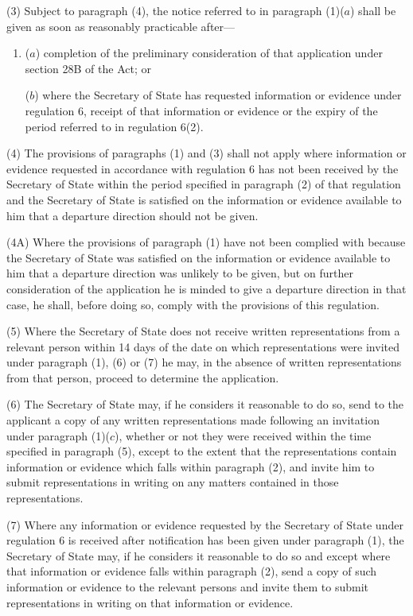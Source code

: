 \documentclass[12pt,a4paper]{article}
\begin{document}
(3) Subject to paragraph (4), the notice referred to in paragraph (1)($a$) shall
be given as soon as reasonably practicable after—
\begin{enumerate}\item[]
($a$) completion of the preliminary consideration of that application under section
28B of the Act; or

($b$) where the Secretary of State has requested information or evidence under regulation 6, receipt of that information or evidence or the expiry of the period 
referred to in regulation 6(2).
\end{enumerate}

(4) The provisions of paragraphs (1) and (3) shall not apply where information
or evidence requested in accordance with regulation 6 has not been received by
the Secretary of State within the period specified in paragraph (2) of that
regulation and the Secretary of State is satisfied on the information or
evidence available to him that a departure direction should not be given.

(4A) Where the provisions of paragraph (1) have not been complied with because the Secretary of State was satisfied on the information or evidence available to him that a departure direction was unlikely to be given, but on further consideration of the application he is minded to give a departure direction in that case, he shall, before doing so, comply with the provisions of this regulation.

(5) Where the Secretary of State does not receive written representations from a
relevant person within 14 days of the date on which representations were invited
under paragraph (1), (6) or (7) he may, in the absence of written
representations from that person, proceed to determine the application.

(6) The Secretary of State may, if he considers it reasonable to do so, send to
the applicant a copy of any written representations made following an invitation
under paragraph (1)($c$), whether or not they were received within the time
specified in paragraph (5), except to the extent that the representations
contain information or evidence which falls within paragraph (2), and invite him
to submit representations in writing on any matters contained in those
representations.

(7) Where any information or evidence requested by the Secretary of State under
regulation 6 is received after notification has been given under paragraph (1),
the Secretary of State may, if he considers it reasonable to do so and except
where that information or evidence falls within paragraph (2), send a copy of
such information or evidence to the relevant persons and invite them to submit
representations in writing on that information or evidence.
\end{document}
